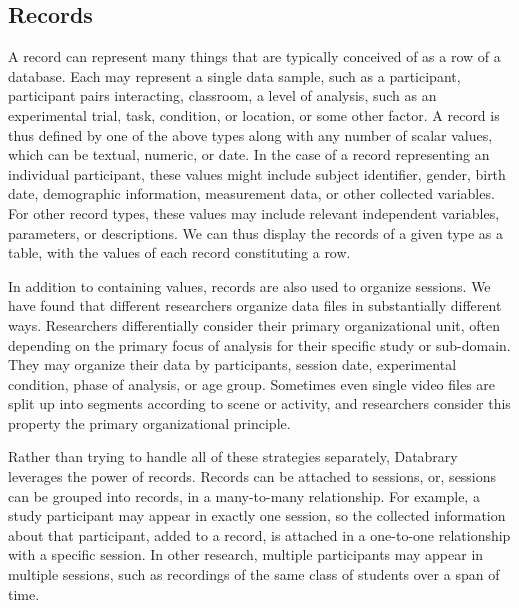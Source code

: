 \documentclass{sig-alternate}
\begin{document}
\subsection{Records}
A record can represent many things that are typically conceived of as a row of a database.
Each may represent a single data sample, such as a participant, participant pairs interacting, classroom, a level of analysis, such as an experimental trial, task, condition, or location, or some other factor. 
A record is thus defined by one of the above types along with any number of scalar values, which can be textual, numeric, or date.
In the case of a record representing an individual participant, these values might include subject identifier, gender, birth date, demographic information, measurement data, or other collected variables.
For other record types, these values may include relevant independent variables, parameters, or descriptions. 
We can thus display the records of a given type as a table, with the values of each record constituting a row.

In addition to containing values, records are also used to organize sessions.
We have found that different researchers organize data files in substantially different ways.
Researchers differentially consider their primary organizational unit, often depending on the primary focus of analysis for their specific study or sub-domain.
They may organize their data by participants, session date, experimental condition, phase of analysis, or age group.
Sometimes even single video files are split up into segments according to scene or activity, and researchers consider this property the primary organizational principle.

Rather than trying to handle all of these strategies separately, Databrary leverages the power of records.
Records can be attached to sessions, or, sessions can be grouped into records, in a many-to-many relationship.
For example, a study participant may appear in exactly one session, so the collected information about that participant, added to a record, is attached in a one-to-one relationship with a specific session.
In other research, multiple participants may appear in multiple sessions, such as recordings of the same class of students over a span of time.
\end{document}

